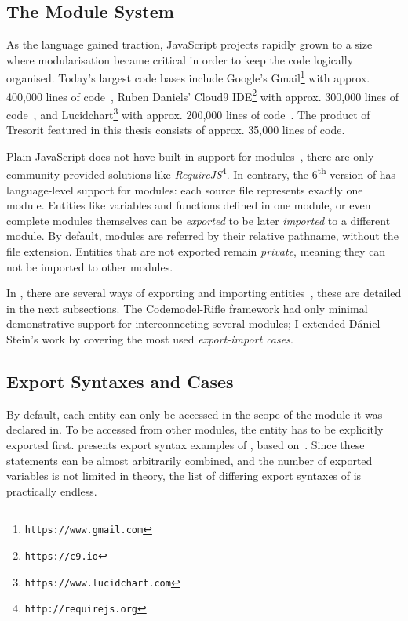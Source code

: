 \subsection{The \es Module System}

As the language gained traction, JavaScript projects rapidly grown to a size where modularisation became critical in order to keep the code logically organised. Today's largest \es code bases include Google's Gmail\footnote{\texttt{https://www.gmail.com}} with approx. 400,000 lines of code~\cite{gmail-loc}, Ruben Daniels' Cloud9 IDE\footnote{\texttt{https://c9.io}} with approx. 300,000 lines of code~\cite{cloud9-loc}, and Lucidchart\footnote{\texttt{https://www.lucidchart.com}} with approx. 200,000 lines of code~\cite{lucidchart-loc}. The product of Tresorit featured in this thesis consists of approx. 35,000 lines of \es code.

Plain JavaScript does not have built-in support for modules~\cite{exploringes6}, there are only community-provided solutions like \emph{RequireJS}\footnote{\texttt{http://requirejs.org}}. In contrary, the 6\textsuperscript{th} version of \es has language-level support for modules: each source file represents exactly one module. Entities like variables and functions defined in one module, or even complete modules themselves can be \emph{exported} to be later \emph{imported} to a different module. By default, modules are referred by their relative pathname, without the file extension. Entities that are not exported remain \emph{private}, meaning they can not be imported to other modules.

In , there are several ways of exporting and importing entities~\cite{exploringes6}, these are detailed in the next subsections. The Codemodel-Rifle framework had only minimal demonstrative support for interconnecting several \es modules; I extended Dániel Stein's work by covering the most used \emph{export-import cases}.


\subsection{Export Syntaxes and Cases}

By default, each entity can only be accessed in the scope of the module it was declared in. To be accessed from other modules, the entity has to be explicitly exported first.  presents export syntax examples of , based on~\cite{export-syntaxes}. Since these statements can be almost arbitrarily combined, and the number of exported variables is not limited in theory, the list of differing export syntaxes of  is practically endless.

